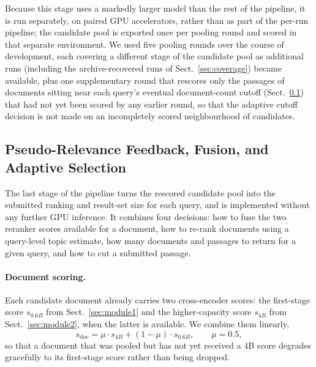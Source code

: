 \documentclass[runningheads]{llncs}
\begin{document}
Because this stage uses a markedly larger model than the rest of the
pipeline, it is run separately, on paired GPU accelerators, rather than as
part of the per-run pipeline; the candidate pool is exported once per pooling
round and scored in that separate environment. We used five pooling rounds
over the course of development, each covering a different stage of the
candidate pool as additional runs (including the archive-recovered runs of
Sect.~\ref{sec:coverage}) became available, plus one supplementary round that
rescores only the passages of documents sitting near each query's eventual
document-count cutoff (Sect.~\ref{sec:fusion}) that had not yet been scored
by any earlier round, so that the adaptive cutoff decision is not made on an
incompletely scored neighbourhood of candidates.

\subsection{Pseudo-Relevance Feedback, Fusion, and Adaptive Selection}
\label{sec:fusion}

The last stage of the pipeline turns the rescored candidate pool into the
submitted ranking and result-set size for each query, and is implemented
without any further GPU inference. It combines four decisions: how to fuse
the two reranker scores available for a document, how to re-rank documents
using a query-level topic estimate, how many documents and passages to
return for a given query, and how to cut a submitted passage.

\paragraph{Document scoring.}
Each candidate document already carries two cross-encoder scores: the
first-stage score $s_{0.6B}$ from Sect.~\ref{sec:module1} and the
higher-capacity score $s_{4B}$ from Sect.~\ref{sec:module2}, when the latter
is available. We combine them linearly,
\begin{equation}
s_{\mathrm{doc}} = \mu \cdot s_{4B} + (1-\mu) \cdot s_{0.6B}, \qquad \mu = 0.5,
\label{eq:mix}
\end{equation}
so that a document that was pooled but has not yet received a $4$B score
degrades gracefully to its first-stage score rather than being dropped.
\end{document}
